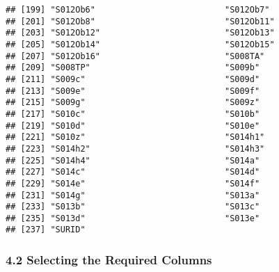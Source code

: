 \documentclass[
]{article}
\begin{document}
\begin{verbatim}
## [199] "S012Ob6"                          "S012Ob7"                         
## [201] "S012Ob8"                          "S012Ob11"                        
## [203] "S012Ob12"                         "S012Ob13"                        
## [205] "S012Ob14"                         "S012Ob15"                        
## [207] "S012Ob16"                         "S008TA"                          
## [209] "S008TP"                           "S009b"                           
## [211] "S009c"                            "S009d"                           
## [213] "S009e"                            "S009f"                           
## [215] "S009g"                            "S009z"                           
## [217] "S010c"                            "S010b"                           
## [219] "S010d"                            "S010e"                           
## [221] "S010z"                            "S014h1"                          
## [223] "S014h2"                           "S014h3"                          
## [225] "S014h4"                           "S014a"                           
## [227] "S014c"                            "S014d"                           
## [229] "S014e"                            "S014f"                           
## [231] "S014g"                            "S013a"                           
## [233] "S013b"                            "S013c"                           
## [235] "S013d"                            "S013e"                           
## [237] "SURID"
\end{verbatim}

\subsubsection{4.2 Selecting the Required
Columns}\label{selecting-the-required-columns}
\end{document}
